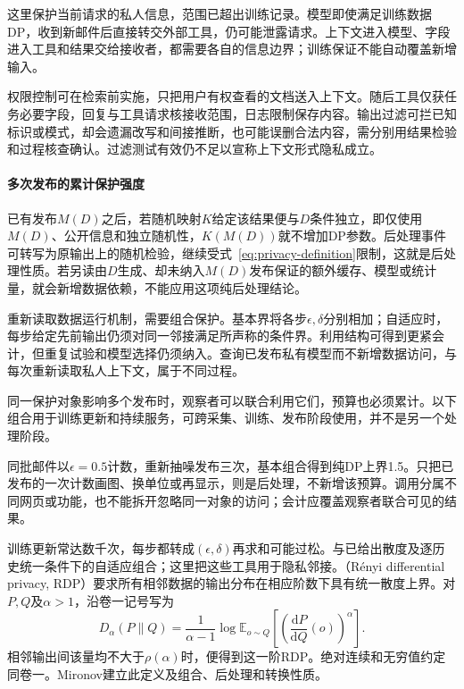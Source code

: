 这里保护当前请求的私人信息，范围已超出训练记录。模型即使满足训练数据DP，收到新邮件后直接转交外部工具，仍可能泄露请求。上下文进入模型、字段进入工具和结果交给接收者，都需要各自的信息边界；训练保证不能自动覆盖新增输入。

权限控制可在检索前实施，只把用户有权查看的文档送入上下文。随后工具仅获任务必要字段，回复与工具请求核接收范围，日志限制保存内容。输出过滤可拦已知标识或模式，却会遗漏改写和间接推断，也可能误删合法内容，需分别用结果检验和过程核查确认。过滤测试有效仍不足以宣称上下文形式隐私成立。

\paragraph{多次发布的累计保护强度}
\label{sec:privacy-repeated-use}

已有发布$M(D)$之后，若随机映射$K$给定该结果便与$D$条件独立，即仅使用$M(D)$、公开信息和独立随机性，$K(M(D))$就不增加DP参数。后处理事件可转写为原输出上的随机检验，继续受式~\eqref{eq:privacy-definition}限制，这就是后处理性质。若另读由$D$生成、却未纳入$M(D)$发布保证的额外缓存、模型或统计量，就会新增数据依赖，不能应用这项纯后处理结论。

重新读取数据运行机制，需要组合保护。基本界将各步$\epsilon,\delta$分别相加；自适应时，每步给定先前输出仍须对同一邻接满足所声称的条件界。利用结构可得到更紧会计，但重复试验和模型选择仍须纳入。查询已发布私有模型而不新增数据访问，与每次重新读取私人上下文，属于不同过程。

同一保护对象影响多个发布时，观察者可以联合利用它们，预算也必须累计。以下组合用于训练更新和持续服务，可跨采集、训练、发布阶段使用，并不是另一个处理阶段。

同批邮件以$\epsilon=0.5$计数，重新抽噪发布三次，基本组合得到纯DP上界1.5。只把已发布的一次计数画图、换单位或再显示，则是后处理，不新增该预算。调用分属不同网页或功能，也不能拆开忽略同一对象的访问；会计应覆盖观察者联合可见的结果。

训练更新常达数千次，每步都转成$(\epsilon,\delta)$再求和可能过松。与已给出散度及逐历史统一条件下的自适应组合；这里把这些工具用于隐私邻接。（Rényi differential privacy, RDP）要求所有相邻数据的输出分布在相应阶数下具有统一散度上界。对$P,Q$及$\alpha>1$，沿卷一记号写为
\begin{equation}
 D_\alpha(P\|Q)=\frac{1}{\alpha-1}
 \log\mathbb E_{o\sim Q}
 \left[\left(\frac{\mathrm dP}{\mathrm dQ}(o)\right)^\alpha\right].
 \label{eq:privacy-renyi}
\end{equation}
相邻输出间该量均不大于$\rho(\alpha)$时，便得到这一阶RDP。绝对连续和无穷值约定同卷一。Mironov建立此定义及组合、后处理和转换性质。

